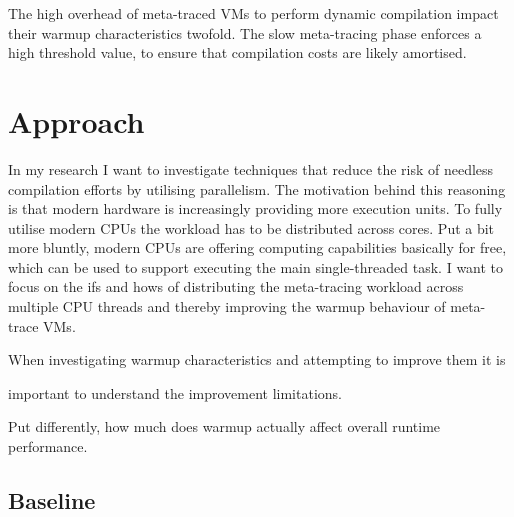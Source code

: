 The high overhead of meta-traced VMs to perform dynamic compilation impact their
warmup characteristics twofold. The slow meta-tracing phase enforces a high
threshold value, to ensure that compilation costs are likely amortised.









\section{Approach}

In my research I want to investigate techniques that reduce the risk of needless
compilation efforts by utilising parallelism. The motivation behind this
reasoning is that modern hardware is increasingly providing more execution
units. To fully utilise modern CPUs the workload has to be distributed across
cores. Put a bit more bluntly, modern CPUs are offering computing capabilities
basically for free, which can be used to support executing the main
single-threaded task. I want to focus on the ifs and hows of distributing the
meta-tracing workload across multiple CPU threads and thereby improving the
warmup behaviour of meta-trace VMs.


When investigating warmup characteristics and attempting to improve them it is


important to understand the improvement limitations.



 Put differently, how much does warmup actually
affect overall runtime performance.


\subsection{Baseline}


